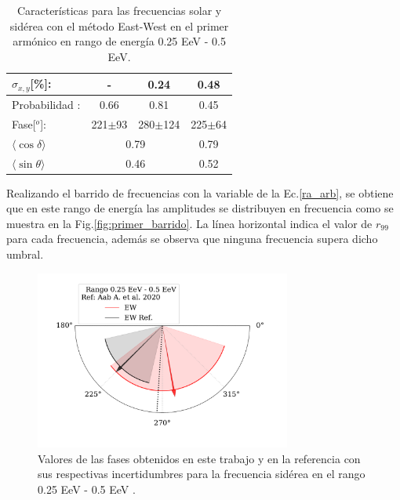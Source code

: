 \begin{table}[H]
\begin{small}
\begin{center}
\begin{tabular}[c]{l|c|c||c|}
\multicolumn{1}{|l|}{$\sigma_{x,y}$[\%]:        } & -	                    & 0.24	                    & 0.48       \\\hline
\multicolumn{1}{|l|}{Probabilidad      :        } & 0.66                    & 0.81	                    & 0.45       \\
\multicolumn{1}{|l|}{Fase[$^o$]:                } & 221$\pm$93              & 280$\pm$124                & 225$\pm$64\\ \hline
\multicolumn{1}{|l|}{$\langle\cos\delta \rangle$} & \multicolumn{2}{c||}{0.79}        	                & 0.79 \cite{codigo}        \\        
\multicolumn{1}{|l|}{$\langle\sin\theta \rangle$} & \multicolumn{2}{c||}{0.46}        	                & 0.52 \cite{codigo}        \\ \hline       
            \end{tabular}
        \end{center}
    \end{small}
    \caption{Características para las frecuencias solar y sidérea con el método East-West en el primer armónico en rango de energía 0.25 EeV - 0.5 EeV.}
    \label{tab:solar}
\end{table}


Realizando el barrido de frecuencias con la variable de la Ec.\ref{ra_arb}, se obtiene que en este rango de energía las amplitudes se  distribuyen en frecuencia como se muestra en la Fig.\ref{fig:primer_barrido}. La línea horizontal indica el valor de $r_{99}$ para cada frecuencia, además se observa que ninguna frecuencia supera dicho umbral.

\begin{figure}[H]
    \begin{small}
        \begin{center}
            \includegraphics[width=0.75\textwidth]{phase_primer_bin_v2.pdf}
        \end{center}
        \caption{Valores de las fases obtenidos en este trabajo y en la referencia con sus respectivas incertidumbres para la frecuencia sidérea en el  rango 0.25 EeV - 0.5 EeV .}
        \label{fig:primer}
    \end{small}
\end{figure}

